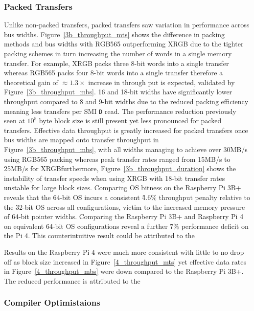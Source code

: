\documentclass[final]{cmpreport}
\begin{document}
\subsubsection{Packed Transfers}
Unlike non-packed transfers, packed transfers saw variation in performance across bus widths. Figure~\ref{3b_throughput_mts} shows the difference in packing methods and bus widths with RGB565 outperforming XRGB due to the tighter packing schemes in turn increasing the number of words in a single memory transfer. For example, XRGB packs three 8-bit words into a single transfer whereas RGB565 packs four 8-bit words into a single transfer therefore a theoretical gain of $\approx 1.3 \times$ increase in through put is expected, validated by Figure~\ref{3b_throughput_mbs}. 16 and 18-bit widths have significantly lower throughput compared to 8 and 9-bit widths due to the reduced packing efficiency meaning less transfers per SMI \texttt{D} read. The performance reduction previously seen at $10^5$ byte block size is still present yet less pronounced for packed transfers. Effective data throughput is greatly increased for packed transfers once bus widths are mapped onto transfer throughput in Figure~\ref{3b_throughput_mbs}, with all widths managing to achieve over 30MB/s using RGB565 packing whereas peak transfer rates ranged from 15MB/s to 25MB/s for XRGB\@ furthermore, Figure~\ref{3b_throughput_duration} shows the instability of transfer speeds when using XRGB with 18-bit transfer rates unstable for large block sizes. Comparing OS bitness on the Raspberry Pi 3B+ reveals that the 64-bit OS incurs a consistent \~4.6\% throughput penalty relative to the 32-bit OS across all configurations, victim to the increased memory pressure of 64-bit pointer widths. Comparing the Raspberry Pi 3B+ and Raspberry Pi 4 on equivalent 64-bit OS configurations reveal a further \~7\% performance deficit on the Pi 4. This counterintuitive result could be attributed to the 

Results on the Raspberry Pi 4 were much more consistent with little to no drop off as block size increased in Figure~\ref{4_throughput_mts} yet effective data rates in Figure~\ref{4_throughput_mbs} were down compared to the Raspberry Pi 3B+. The reduced performance is attributed to the 

\subsubsection{Compiler Optimistaions}
\end{document}
